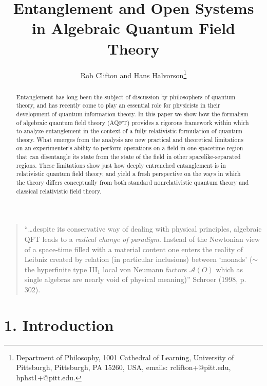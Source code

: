 \documentclass[12pt]{article}
\title{Entanglement and Open Systems in Algebraic Quantum Field Theory}
\author{Rob Clifton and Hans Halvorson\footnote{Department of Philosophy,
 1001 Cathedral of
Learning, University of
Pittsburgh, Pittsburgh, PA 15260, USA, emails: rclifton+@pitt.edu, 
hphst1+@pitt.edu.}}
\newcommand{\alg}[1]{\mbox{$\mathcal{#1}$}}
\begin{document}
\maketitle 
\begin{abstract}
Entanglement has long been the subject of discussion by philosophers 
of quantum theory, and has recently come to play an essential role 
for physicists in their development of quantum information theory.  
In this paper we show how the formalism of algebraic quantum 
field theory (AQFT) provides a rigorous framework within which to 
analyze entanglement in the context of a fully relativistic formulation 
of quantum theory.  What emerges from the analysis 
are new practical and theoretical limitations on an 
experimenter's ability to perform operations on a field in one spacetime region 
that can disentangle its state from the state of the field in other 
spacelike-separated regions.  These limitations show just how deeply 
entrenched entanglement is in relativistic quantum field theory, and yield a 
fresh perspective on the ways in which the theory differs conceptually 
from both standard
nonrelativistic quantum theory and classical relativistic field 
theory.         
  \end{abstract} 

  \begin{quote}
``\ldots despite its conservative way of dealing with physical 
principles, algebraic QFT leads to a \emph{radical change of 
paradigm}.  Instead of the Newtonian view of a space-time filled with 
a material content one enters the reality of Leibniz created by 
relation (in particular inclusions) between `monads' ($\sim$ the 
hyperfinite type III$_{1}$ local von Neumann factors $\alg{A}(O)$ which 
as single algebras are nearly void of physical meaning)'' Schroer  
(1998, p. 302).
\end{quote}
   
 \section*{1. Introduction}
 
\end{document}
